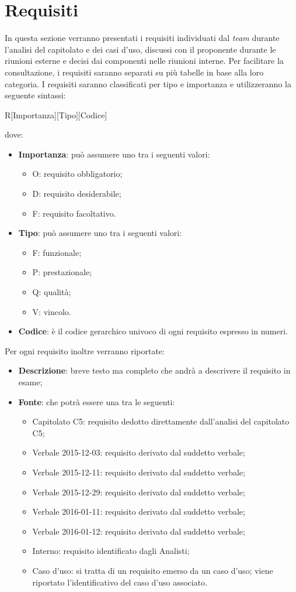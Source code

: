 \newpage
\section{Requisiti}
In questa sezione verranno presentati i requisiti individuati dal \textit{team} durante l'analisi del capitolato e dei casi d'uso, discussi con il proponente durante le riunioni esterne e decisi dai componenti nelle riunioni interne. Per facilitare la consultazione, i
requisiti saranno separati su più tabelle in base alla loro categoria. I requisiti saranno classificati per tipo e importanza e utilizzeranno la seguente sintassi:
\begin{center}
	R[Importanza][Tipo][Codice]
\end{center}
dove:
\begin{itemize}
	\item \textbf{Importanza}: può assumere uno tra i seguenti valori:
	\begin{itemize}
		\item O: requisito obbligatorio;
		\item D: requisito desiderabile;
		\item F: requisito facoltativo.
	\end{itemize}
	\item \textbf{Tipo}: può assumere uno tra i seguenti valori:
	\begin{itemize}
		\item F: funzionale;
		\item P: prestazionale;
		\item Q: qualità;
		\item V: vincolo.
	\end{itemize}
	\item \textbf{Codice}: è il codice gerarchico univoco di ogni requisito espresso in numeri.
\end{itemize} 
Per ogni requisito inoltre verranno riportate:
\begin{itemize}
	\item \textbf{Descrizione}: breve testo ma completo che andrà a descrivere il requisito in esame;
	\item \textbf{Fonte}: che potrà essere una tra le seguenti:
	\begin{itemize}
		\item Capitolato C5: requisito dedotto direttamente dall'analisi del capitolato C5;
		\item Verbale 2015-12-03: requisito derivato dal suddetto verbale;
		\item Verbale 2015-12-11: requisito derivato dal suddetto verbale;
		\item Verbale 2015-12-29: requisito derivato dal suddetto verbale;
		\item Verbale 2016-01-11: requisito derivato dal suddetto verbale;
		\item Verbale 2016-01-12: requisito derivato dal suddetto verbale;
		\item Interno: requisito identificato dagli Analisti;
		\item Caso d’uso: si tratta di un requisito emerso da un caso d’uso; viene riportato l’identificativo del caso d’uso associato.
	\end{itemize} 
\end{itemize}
%



